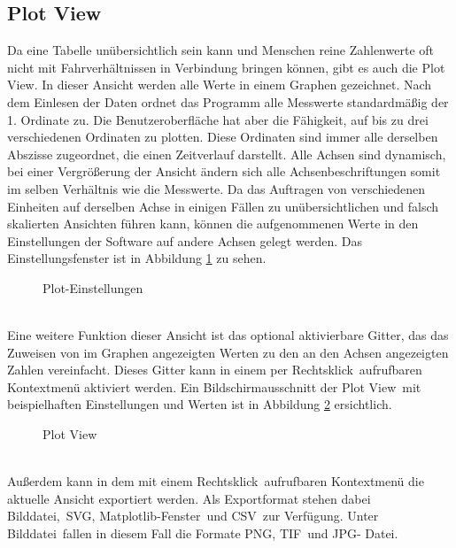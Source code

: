 \subsection{Plot View}
\label{subsec:VisPlotView}
Da eine Tabelle unübersichtlich sein kann und Menschen reine Zahlenwerte oft nicht mit Fahrverhältnissen in Verbindung bringen können, gibt es auch die \glqq Plot View\grqq . In dieser Ansicht werden alle Werte in einem Graphen gezeichnet. Nach dem Einlesen der Daten ordnet das Programm alle Messwerte standardmäßig der 1. Ordinate zu. Die Benutzeroberfläche hat aber die Fähigkeit, auf bis zu drei verschiedenen Ordinaten zu plotten. Diese Ordinaten sind immer alle derselben Abszisse zugeordnet, die einen Zeitverlauf darstellt. Alle Achsen sind dynamisch, bei einer Vergrößerung der Ansicht ändern sich alle Achsenbeschriftungen somit im selben Verhältnis wie die Messwerte. Da das Auftragen von verschiedenen Einheiten auf derselben Achse in einigen Fällen zu unübersichtlichen und falsch skalierten Ansichten führen kann, können die aufgenommenen Werte in den Einstellungen der Software auf andere Achsen gelegt werden. Das Einstellungsfenster ist in Abbildung \ref{fig:plotsettings} zu sehen.
\begin{figure}[h]
\centering
\missingfigure{}
\caption{Plot-Einstellungen}
\label{fig:plotsettings}
\end{figure}
\\
Eine weitere Funktion dieser Ansicht ist das optional aktivierbare Gitter, das das Zuweisen von im Graphen angezeigten Werten zu den an den Achsen angezeigten Zahlen vereinfacht. Dieses Gitter kann in einem per \glqq Rechtsklick\grqq \ aufrufbaren Kontextmenü aktiviert werden. Ein Bildschirmausschnitt der \glqq Plot View\grqq \ mit beispielhaften Einstellungen und Werten ist in Abbildung \ref{fig:PlotView} ersichtlich.
\begin{figure}[h]
\centering
\missingfigure{}
\caption{Plot View}
\label{fig:PlotView}
\end{figure}
\\
Außerdem kann in dem mit einem \glqq Rechtsklick\grqq \ aufrufbaren Kontextmenü die aktuelle Ansicht exportiert werden. Als Exportformat stehen dabei \glqq Bilddatei\grqq ,\ \glqq \ac{SVG}\grqq , \glqq Matplotlib-Fenster\grqq\ und \glqq \ac{CSV}\grqq\ zur Verfügung. Unter \glqq Bilddatei\grqq\ fallen in diesem Fall die Formate \glqq\ac{PNG}\grqq , \glqq\ac{TIF}\grqq\ und \glqq\ac{JPG}- Datei\grqq .
